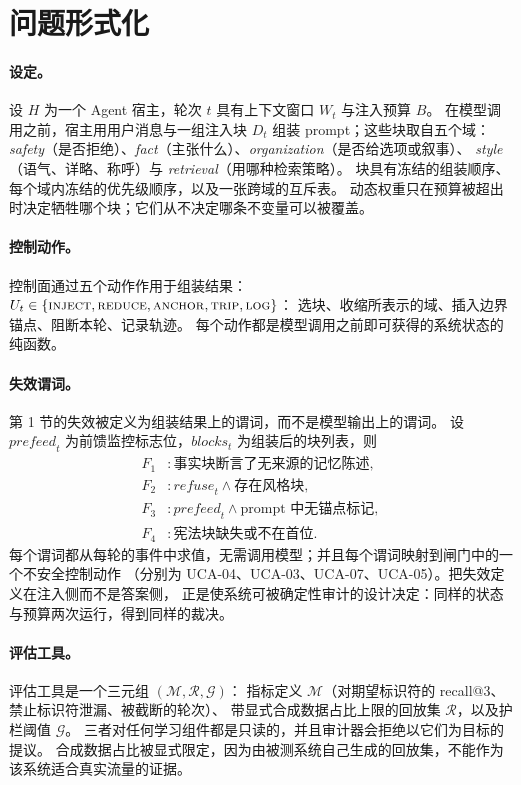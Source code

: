 \section{问题形式化}

\paragraph{设定。} 设 $H$ 为一个 Agent 宿主，轮次 $t$ 具有上下文窗口 $W_t$ 与注入预算 $B$。
在模型调用之前，宿主用用户消息与一组注入块 $D_t$ 组装 prompt；这些块取自五个域：
\emph{safety}（是否拒绝）、\emph{fact}（主张什么）、\emph{organization}（是否给选项或叙事）、
\emph{style}（语气、详略、称呼）与 \emph{retrieval}（用哪种检索策略）。
块具有冻结的组装顺序、每个域内冻结的优先级顺序，以及一张跨域的互斥表。
动态权重只在预算被超出时决定牺牲哪个块；它们从不决定哪条不变量可以被覆盖。

\paragraph{控制动作。} 控制面通过五个动作作用于组装结果：
$U_t \in \{\text{\textsc{inject}}, \text{\textsc{reduce}},
\text{\textsc{anchor}}, \text{\textsc{trip}}, \text{\textsc{log}}\}$：
选块、收缩所表示的域、插入边界锚点、阻断本轮、记录轨迹。
每个动作都是模型调用之前即可获得的系统状态的纯函数。

\paragraph{失效谓词。} 第 1 节的失效被定义为组装结果上的谓词，而不是模型输出上的谓词。
设 $\mathit{prefeed}_t$ 为前馈监控标志位，$\mathit{blocks}_t$ 为组装后的块列表，则
\begin{align}
F_1 &: \text{事实块断言了无来源的记忆陈述},\\
F_2 &: \mathit{refuse}_t \wedge \text{存在风格块},\\
F_3 &: \mathit{prefeed}_t \wedge \text{prompt 中无锚点标记},\\
F_4 &: \text{宪法块缺失或不在首位}.
\end{align}
每个谓词都从每轮的事件中求值，无需调用模型；并且每个谓词映射到闸门中的一个不安全控制动作
（分别为 UCA-04、UCA-03、UCA-07、UCA-05）。把失效定义在注入侧而不是答案侧，
正是使系统可被确定性审计的设计决定：同样的状态与预算两次运行，得到同样的裁决。

\paragraph{评估工具。} 评估工具是一个三元组 $(\mathcal{M}, \mathcal{R}, \mathcal{G})$：
指标定义 $\mathcal{M}$（对期望标识符的 recall@3、禁止标识符泄漏、被截断的轮次）、
带显式合成数据占比上限的回放集 $\mathcal{R}$，以及护栏阈值 $\mathcal{G}$。
三者对任何学习组件都是只读的，并且审计器会拒绝以它们为目标的提议。
合成数据占比被显式限定，因为由被测系统自己生成的回放集，不能作为该系统适合真实流量的证据。

